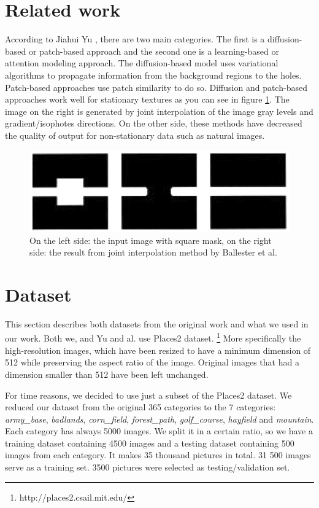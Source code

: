 \documentclass[a4paper, 11pt]{article}
\begin{document}
\section{Related work}
\label{section:relatedWork}
According to Jiahui Yu \cite{Yu}, there are two main categories. The first is a diffusion-based or patch-based approach and the second one is a learning-based or attention modeling approach.
The diffusion-based model uses variational algorithms to propagate information from the background regions to the holes. Patch-based approaches use patch similarity to do so. Diffusion and patch-based approaches work well for stationary textures as you can see in figure \ref{img:patchApproach}. The image on the right is generated by joint interpolation of the image gray levels and gradient/isophotes directions. \cite{patch}
On the other side, these methods have decreased the quality of output for non-stationary data such as natural images.
\begin{figure}
    \centering
    \includegraphics[width=0.95\linewidth]{documentation/img/patchApproach.png}
    \caption{On the left side: the input image with square mask, on the right side: the result from joint interpolation method by Ballester et al.}
    \label{img:patchApproach}
\end{figure}


\section{Dataset}
\label{section:dataset}
This section describes both datasets from the original work and what we used in our work.
Both we, and Yu and al. use Places2 dataset. \footnote{http://places2.csail.mit.edu/} More specifically the high-resolution images, which have been resized to have a minimum dimension of 512 while preserving the aspect ratio of the image. Original images that had a dimension smaller than 512 have been left unchanged.

For time reasons, we decided to use just a subset of the Places2 dataset. We reduced our dataset from the original 365 categories to the 7 categories: \textit{army\_base}, \textit{badlands}, \textit{corn\_field},
\textit{forest\_path}, \textit{golf\_course}, \textit{hayfield} and \textit{mountain}. 
Each category has always 5000 images. We split it in a certain ratio, so we have a training dataset containing 4500 images and a testing dataset containing 500 images from each category.
It makes 35 thousand pictures in total. 31 500 images serve as a training set. 3500 pictures were selected as testing/validation set.
\end{document}
